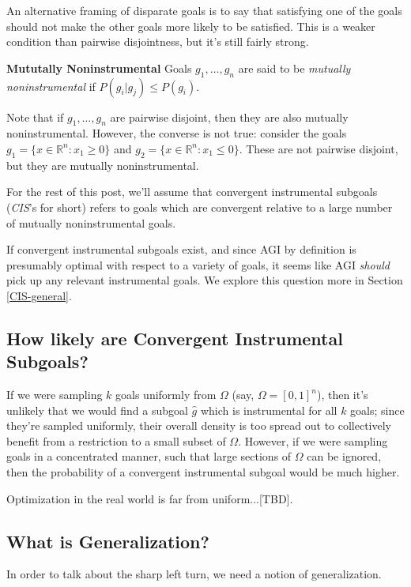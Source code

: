 \documentclass{article}
\begin{document}
An alternative framing of disparate goals is to say that satisfying one of the goals should not make the other goals more likely to be satisfied. This is a weaker condition than pairwise disjointness, but it's still fairly strong.

\begin{definition}{\textbf{Mututally Noninstrumental}}
    Goals $g_1, \dots, g_n$ are said to be \emph{mutually noninstrumental} if $P(g_i|g_j)\le P(g_i)$.
\end{definition}

Note that if $g_1, \dots, g_n$ are pairwise disjoint, then they are also mutually noninstrumental. However, the converse is not true: consider the goals $g_1=\{x\in\mathbb{R}^n: x_1\ge 0\}$ and $g_2=\{x\in\mathbb{R}^n: x_1\le 0\}$. These are not pairwise disjoint, but they are mutually noninstrumental.

For the rest of this post, we'll assume that convergent instrumental subgoals (\emph{CIS}'s for short) refers to goals which are convergent relative to a large number of mutually noninstrumental goals. 

If convergent instrumental subgoals exist, and since AGI by definition is presumably optimal with respect to a variety of goals, it seems like AGI \emph{should} pick up any relevant instrumental goals. We explore this question more in Section \ref{CIS-general}.

\subsection{How likely are Convergent Instrumental Subgoals?}
If we were sampling $k$ goals uniformly from $\Omega$ (say, $\Omega=[0,1]^n$), then it's unlikely that we would find a subgoal $\hat{g}$ which is instrumental for all $k$ goals; since they're sampled uniformly, their overall density is too spread out to collectively benefit from a  restriction to a small subset of $\Omega$. However, if we were sampling goals in a concentrated manner, such that large sections of $\Omega$ can be ignored, then the probability of a convergent instrumental subgoal would be much higher.

Optimization in the real world is far from uniform...[TBD].

\subsection{What is Generalization?}
In order to talk about the sharp left turn, we need a notion of generalization.
\end{document}
